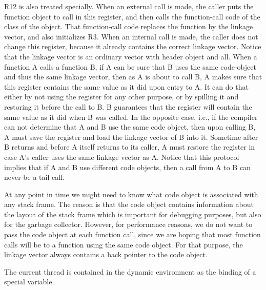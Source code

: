 R12 is also treated specially.  When an external call is made, the
caller puts the function object to call in this register, and then
calls the function-call code of the class of the object.  That
function-call code replaces the function by the linkage vector, and
also initializes R3.  When an internal call is made, the caller does
not change this register, because it already contains the correct
linkage vector.  Notice that the linkage vector is an ordinary \cl{}
vector with header object and all.  When a function A calls a function
B, if A can be sure that B uses the same code-object and thus the same
linkage vector, then as A is about to call B, A makes sure that this
register contains the same value as it did upon entry to A.  It can do
that either by not using the register for any other purpose, or by
spilling it and restoring it before the call to B.  B guarantees that
the register will contain the same value as it did when B was called.
In the opposite case, i.e., if the compiler can not determine that A
and B use the same code object, then upon calling B, A must save the
register and load the linkage vector of B into it.  Sometime after B
returns and before A itself returns to its caller, A must restore the
register in case A's caller uses the same linkage vector as A.  Notice
that this protocol implies that if A and B use different code objects,
then a call from A to B can never be a tail call.

At any point in time we might need to know what code object is
associated with any stack frame.  The reason is that the code object
contains information about the layout of the stack frame which is
important for debugging purposes, but also for the garbage collector.
However, for performance reasons, we do not want to pass the code
object at each function call, since we are hoping that most function
calls will be to a function using the same code object.  For that
purpose, the linkage vector always contains a back pointer to the code
object. 

The current thread is contained in the dynamic environment as the
binding of a special variable.
